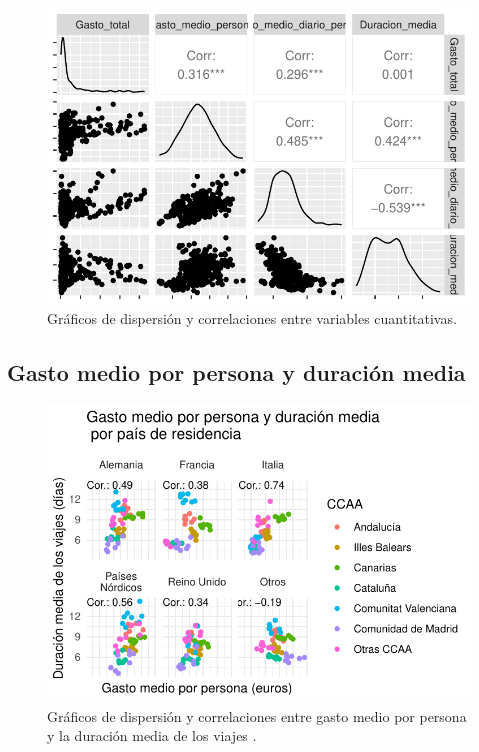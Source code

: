 \documentclass[data,article,submit,moreauthors,pdftex]{Definitions/mdpi}
\begin{document}
\begin{figure}[H]
\includegraphics{ProyectoAED2024_Rmd_files/figure-latex/unnamed-chunk-31-1} \caption{Gráficos de dispersión y correlaciones entre variables cuantitativas.\label{fig:correlaciones}}\label{fig:unnamed-chunk-31}
\end{figure}

\hypertarget{gasto-medio-por-persona-y-duraciuxf3n-media}{%
\subsection{Gasto medio por persona y duración
media}\label{gasto-medio-por-persona-y-duraciuxf3n-media}}

\begin{figure}[H]
\includegraphics{ProyectoAED2024_Rmd_files/figure-latex/unnamed-chunk-32-1} \caption{Gráficos de dispersión y correlaciones entre gasto medio por persona y la duración media de los viajes .\label{fig:gastomediovsduracionmedia}}\label{fig:unnamed-chunk-32}
\end{figure}
\end{document}
